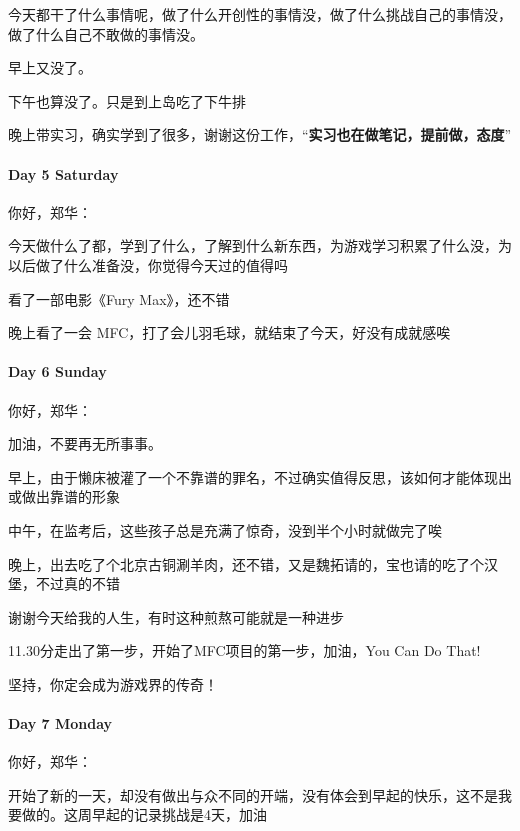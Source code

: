 \documentclass[UTF8,a4paper,8pt]{ctexart}
\begin{document}
       今天都干了什么事情呢，做了什么开创性的事情没，做了什么挑战自己的事情没，做了什么自己不敢做的事情没。
       
       早上又没了。
       
       下午也算没了。只是到上岛吃了下牛排
       
       晚上带实习，确实学到了很多，谢谢这份工作，“\textbf{实习也在做笔记，提前做，态度}”
      
      \paragraph{Day 5  Saturday \  \ }
      你好，郑华：
      
      今天做什么了都，学到了什么，了解到什么新东西，为游戏学习积累了什么没，为以后做了什么准备没，你觉得今天过的值得吗
      
      看了一部电影《Fury Max》，还不错
      
      晚上看了一会 MFC，打了会儿羽毛球，就结束了今天，好没有成就感唉
      
      \paragraph{Day 6  Sunday  \  \ }
      
      你好，郑华：
      
      加油，不要再无所事事。
      
      早上，由于懒床被灌了一个不靠谱的罪名，不过确实值得反思，该如何才能体现出或做出靠谱的形象
      
      中午，在监考后，这些孩子总是充满了惊奇，没到半个小时就做完了唉
      
      晚上，出去吃了个北京古铜涮羊肉，还不错，又是魏拓请的，宝也请的吃了个汉堡，不过真的不错
      
      谢谢今天给我的人生，有时这种煎熬可能就是一种进步
      
      11.30分走出了第一步，开始了MFC项目的第一步，加油，You Can Do That!
      
      坚持，你定会成为游戏界的传奇！
      
       \paragraph{Day 7  Monday  \  \ }
       你好，郑华：
       
       开始了新的一天，却没有做出与众不同的开端，没有体会到早起的快乐，这不是我要做的。这周早起的记录挑战是4天，加油
       
\end{document}
